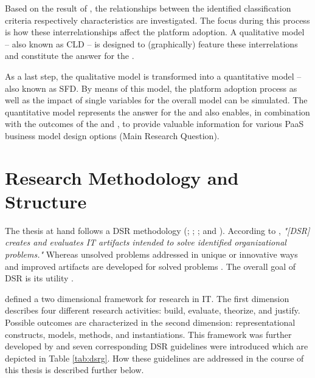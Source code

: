 Based on the result of , the relationships between the identified classification criteria respectively characteristics are investigated. The focus during this process is how these interrelationships affect the platform adoption. A qualitative model -- also known as \ac{CLD} -- is designed to (graphically) feature these interrelations and constitute the answer for the .

As a last step, the qualitative model is transformed into a quantitative model -- also known as \ac{SFD}. By means of this model, the platform adoption process as well as the impact of single variables for the overall model can be simulated. The quantitative model represents the answer for the  and also enables, in combination with the outcomes of the  and , to provide valuable information for various \ac{PaaS} business model design options (Main Research Question).
	
\section{Research Methodology and Structure}\label{ch:intro:met}

The thesis at hand follows a \ac{DSR} methodology (\citealp{March1995}; \citealp{Hevner2004}; \citealp{Hevner2007}; and \citealp{Peffers2007}). According to \citep[p. 77]{Hevner2004}, \textit{"[\ac{DSR}] creates and evaluates IT artifacts intended to solve identified organizational problems."} Whereas unsolved problems addressed in unique or innovative ways and improved artifacts are developed for solved problems \citep[p. 81]{Hevner2004}. The overall goal of \ac{DSR} is its utility \citep[p. 80]{Hevner2004}.

\citet[pp. 255-262]{March1995} defined a two dimensional framework for research in IT. The first dimension describes four different research activities: build, evaluate, theorize, and justify. Possible outcomes are characterized in the second dimension: representational constructs, models, methods, and instantiations. This framework was further developed by \citet[pp. 78-81]{Hevner2004} and seven corresponding \ac{DSR} guidelines were introduced \citep[pp. 82-90]{Hevner2004} which are depicted in Table \ref{tab:dsrg}. How these guidelines are addressed in the course of this thesis is described further below.

